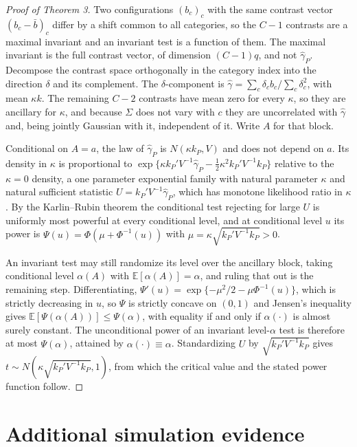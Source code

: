 \documentclass[12pt]{article}
\theoremstyle{definition}
\numberwithin{equation}{section}
\begin{document}
\begin{proof}[Proof of Theorem 3]
Two configurations $(b_c)_c$ with the same contrast vector $(b_c - \bar{b})_c$
differ by a shift common to all categories, so the $C-1$ contrasts are a maximal
invariant and an invariant test is a function of them. The maximal invariant is
the full contrast vector, of dimension $(C-1)q$, and not $\hat{\gamma}_P$.
Decompose the contrast space orthogonally in the category index into the
direction $\delta$ and its complement. The $\delta$-component is
$\hat{\gamma} = \sum_c \delta_c b_c/\sum_c \delta_c^2$, with mean $\kappa k$.
The remaining $C-2$ contrasts have mean zero for every $\kappa$, so they are
ancillary for $\kappa$, and because $\Sigma$ does not vary with $c$ they are
uncorrelated with $\hat{\gamma}$ and, being jointly Gaussian with it,
independent of it. Write $A$ for that block.

Conditional on $A = a$, the law of $\hat{\gamma}_P$ is $N(\kappa k_P, V)$ and
does not depend on $a$. Its density in $\kappa$ is proportional to
$\exp\{\kappa k_P'V^{-1}\hat{\gamma}_P - \tfrac{1}{2}\kappa^2 k_P'V^{-1}k_P\}$
relative to the $\kappa = 0$ density, a one parameter exponential family with
natural parameter $\kappa$ and natural sufficient statistic $U =
k_P'V^{-1}\hat{\gamma}_P$, which has monotone likelihood ratio in $\kappa$. By
the Karlin--Rubin theorem \citep{lehmann2005testing} the conditional test
rejecting for large $U$ is uniformly most powerful at every conditional level,
and at conditional level $u$ its power is $\Psi(u) = \Phi(\mu + \Phi^{-1}(u))$
with $\mu = \kappa\sqrt{k_P'V^{-1}k_P} > 0$.

An invariant test may still randomize its level over the ancillary block, taking
conditional level $\alpha(A)$ with $\mathbb{E}[\alpha(A)] = \alpha$, and ruling
that out is the remaining step. Differentiating, $\Psi'(u) =
\exp\{-\mu^2/2 - \mu\Phi^{-1}(u)\}$, which is strictly decreasing in $u$, so
$\Psi$ is strictly concave on $(0,1)$ and Jensen's inequality gives
$\mathbb{E}[\Psi(\alpha(A))] \le \Psi(\alpha)$, with equality if and only if
$\alpha(\cdot)$ is almost surely constant. The unconditional power of an
invariant level-$\alpha$ test is therefore at most $\Psi(\alpha)$, attained by
$\alpha(\cdot) \equiv \alpha$. Standardizing $U$ by $\sqrt{k_P'V^{-1}k_P}$ gives
$t \sim N(\kappa\sqrt{k_P'V^{-1}k_P},1)$, from which the critical value and the
stated power function follow.
\end{proof}

\section{Additional simulation evidence}
\end{document}
